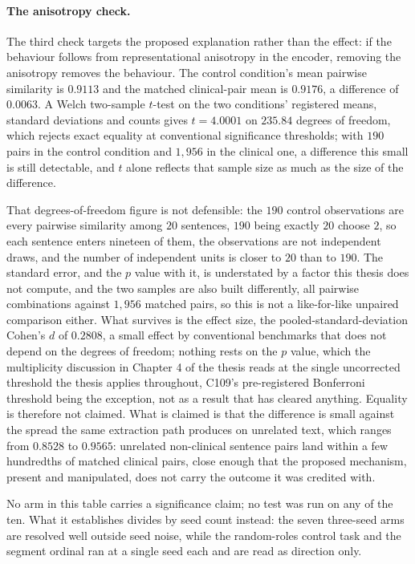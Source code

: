 \paragraph{The anisotropy check.} The third check targets the proposed
explanation rather than the effect: if the behaviour follows from
representational anisotropy in the encoder, removing the anisotropy removes the
behaviour. The control condition's mean pairwise similarity is
$0.9113$ and the matched clinical-pair mean is $0.9176$, a difference of
$0.0063$. A Welch two-sample $t$-test on
the two conditions' registered means, standard deviations and counts gives
$t = 4.0001$ on $235.84$ degrees of freedom,
which rejects exact equality at conventional significance thresholds; with
$190$ pairs in the control condition and $1{,}956$ in the clinical one, a
difference this small is still detectable, and $t$ alone reflects that
sample size as much as the size of the difference.

That degrees-of-freedom figure is not defensible: the $190$ control
observations are every pairwise similarity among $20$ sentences, $190$ being
exactly $20$ choose $2$, so each sentence enters nineteen of them, the
observations are not independent draws, and the number of independent units
is closer to $20$ than to $190$. The standard error, and the $p$ value with
it, is understated by a factor this thesis does not compute, and the two
samples are also built differently, all pairwise combinations against
$1{,}956$ matched pairs, so this is not a like-for-like unpaired comparison
either. What survives is the effect size, the pooled-standard-deviation
Cohen's $d$ of $0.2808$, a small effect by conventional benchmarks that does
not depend on the degrees of freedom; nothing rests on the $p$ value,
which the multiplicity discussion in Chapter 4 of the thesis reads at the single uncorrected
threshold the thesis applies throughout, C109's pre-registered Bonferroni threshold being the
exception, not as a result that has cleared
anything. Equality is therefore not claimed.
What is claimed is that the difference is small against the spread the same
extraction path produces on unrelated text, which ranges from $0.8528$ to
$0.9565$: unrelated non-clinical sentence pairs
land within a few hundredths of matched clinical pairs, close enough that the
proposed mechanism, present and manipulated, does not carry the outcome it was
credited with.

No arm in this table carries a significance claim; no test was run on any of
the ten. What it establishes divides by seed count instead: the seven
three-seed arms are resolved well outside seed noise, while the random-roles
control task and the segment ordinal ran at a single seed each and are read as
direction only.


